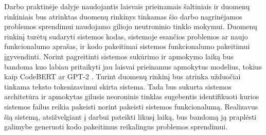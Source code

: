 \documentclass{VUMIFPSbakalaurinis}
\begin{document}
Darbo praktinėje dalyje naudojantis laisvais prieinamais šaltiniais ir duomenų rinkiniais bus atrinktas duomenų rinkinys tinkamas šio darbo nagrinėjamos problemos sprendimui naudojamo giliojo neutroninio tinklo mokymui.
Duomenų rinkinį turėtų sudaryti sistemos kodas, sistemoje esančios problemos ar naujo funkcionalumo aprašas, ir kodo pakeitimai sistemos funkcionalumo pakeitimui įgyvendinti.
Norint pagreitinti sistemos sukūrimo ir apmokymo laiką bus bandoma kuo labiau pritaikyti jau laisvai prieinamus apmokytus modelius, tokius kaip CodeBERT \cite{feng2020codebert} ar GPT-2 \cite{radford2019language}.
Turint duomenų rinkinį bus atrinka užduočiai tinkama teksto tokenizavimui skirta sistema.
Tada bus sukurta sistemos architetūra ir apmokytas gilusis neoroninis tinklas sugebentis identifikuoti kurios sistemos failus reikia pakeisti norint pakeisti sistemos funkcionalumą.
Realizavus šią sistemą, atsižvelgiant į darbui pateikti likusį laiką, bus bandomą ją praplėsti galimybe generuoti kodo pakeitimus reikalingus problemos sprendimui.






\end{document}
